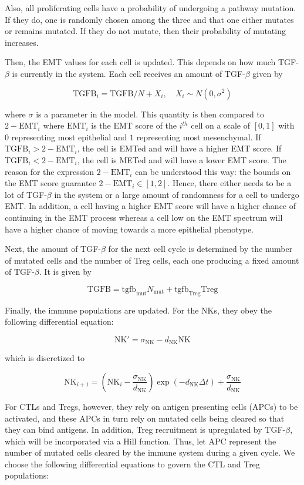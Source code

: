 \documentclass{article}
\begin{document}
Also, all proliferating cells have a probability of undergoing a pathway mutation.
If they do, one is randomly chosen among the three and that one either mutates or remains mutated.
If they do not mutate, then their probability of mutating increases.

Then, the EMT values for each cell is updated.
This depends on how much TGF-$\beta$ is currently in the system.
Each cell receives an amount of TGF-$\beta$ given by

$$ \text{TGFB}_i = \text{TGFB}/N + X_i, \quad X_i \sim N(0,\sigma^2)  $$

where $\sigma$ is a parameter in the model.
This quantity is then compared to $2-\text{EMT}_i$ where $\text{EMT}_i$ is the EMT score of the $i^{th}$ cell on a scale of $[0,1]$ with $0$ representing most epithelial and $1$ representing most mesenchymal.
If $\text{TGFB}_i>2-\text{EMT}_i$, the cell is EMTed and will have a higher EMT score.
If $\text{TGFB}_i<2-\text{EMT}_i$, the cell is METed and will have a lower EMT score.
The reason for the expression $2-\text{EMT}_i$ can be understood this way: 
the bounds on the EMT score guarantee $2-\text{EMT}_i\in[1,2]$.
Hence, there either needs to be a lot of TGF-$\beta$ in the system or a large amount of randomness for a cell to undergo EMT.
In addition, a cell having a higher EMT score will have a higher chance of continuing in the EMT process whereas a cell low on the EMT spectrum will have a higher chance of moving towards a more epithelial phenotype.

Next, the amount of TGF-$\beta$ for the next cell cycle is determined by the number of mutated cells and the number of Treg cells, each one producing a fixed amount of TGF-$\beta$. It is given by

$$ \text{TGFB} = \text{tgfb}_{\text{mut}}N_{\text{mut}} + \text{tgfb}_{\text{Treg}}\text{Treg}$$

Finally, the immune populations are updated.
For the NKs, they obey the following differential equation:
 
$$ \text{NK}' = \sigma_{\text{NK}} - d_{\text{NK}}\text{NK} $$

which is discretized to

$$ \text{NK}_{i+1} = \left (\text{NK}_i-\frac{\sigma_{\text{NK}}}{d_{\text{NK}}} \right )\exp(-d_{\text{NK}}\Delta t)+\frac{\sigma_{\text{NK}}}{d_{\text{NK}}} $$

For CTLs and Tregs, however, they rely on antigen presenting cells (APCs) to be activated, and these APCs in turn rely on mutated cells being cleared so that they can bind antigens.
In addition, Treg recruitment is upregulated by TGF-$\beta$, which will be incorporated via a Hill function.
Thus, let $\text{APC}$ represent the number of mutated cells cleared by the immune system during a given cycle.
We choose the following differential equations to govern the CTL and Treg populations:
\end{document}
